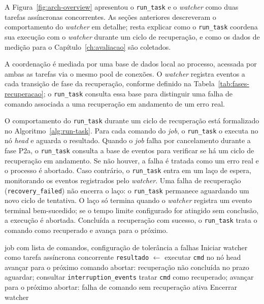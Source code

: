 A Figura~\ref{fig:arch-overview} apresentou o \texttt{run\_task} e o \textit{watcher} como
duas tarefas assíncronas concorrentes. As seções anteriores
descreveram o comportamento do \textit{watcher} em detalhe; resta explicar como o
\texttt{run\_task} coordena sua execução com o \textit{watcher} durante um ciclo de recuperação,
e como os dados de medição para o Capítulo~\ref{ch:avaliacao} são coletados.

A coordenação é mediada por uma base de dados local ao processo, acessada por
ambas as tarefas via o mesmo pool de conexões. O \textit{watcher} registra eventos a cada
transição de fase da recuperação, conforme definido na Tabela~\ref{tab:fases-recuperacao};
o \texttt{run\_task} consulta essa base para distinguir uma falha de comando associada
a uma recuperação em andamento de um erro real.

O comportamento do \texttt{run\_task} durante um ciclo de recuperação está formalizado
no Algoritmo~\ref{alg:run-task}. Para cada comando do \textit{job}, o \texttt{run\_task} o
executa no nó \textit{head} e aguarda o resultado.
Quando o \textit{job} falha por cancelamento durante a fase P2a, o \texttt{run\_task} consulta
a base de eventos para verificar se há um ciclo de recuperação em andamento.
Se não houver, a falha é tratada como um erro real e o processo é abortado. Caso contrário,
o \texttt{run\_task} entra em um laço de espera, monitorando os eventos registrados pelo \textit{watcher}.
Uma falha de recuperação (\texttt{recovery\_failed}) não encerra o laço: o \texttt{run\_task}
permanece aguardando um novo ciclo de tentativa. O laço só termina quando o \textit{watcher} registra um
evento terminal bem-sucedido; se o tempo limite configurado for atingido sem conclusão,
a execução é abortada. Concluída a recuperação com sucesso, o \texttt{run\_task} trata o comando
como recuperado e avança para o próximo.


\begin{algorithm}[htb]
  \caption{Laço do \texttt{run\_task} com tolerância a falhas ativa.}
  \label{alg:run-task}
  \begin{algorithmic}[1]
    \Require job com lista de comandos, configuração de tolerância a falhas
    \State Iniciar watcher como tarefa assíncrona concorrente
      \State \texttt{resultado} $\leftarrow$ executar \texttt{cmd} no nó head
        \State avançar para o próximo comando
            \State abortar: recuperação não concluída no prazo
          \EndIf
          \State aguardar; consultar \texttt{interruption\_events}
        \EndWhile
        \State tratar \texttt{cmd} como recuperado; avançar para o próximo
      \Else
        \State abortar: falha de comando sem recuperação ativa
      \EndIf
    \EndFor
    \State Encerrar watcher
  \end{algorithmic}
\end{algorithm}


